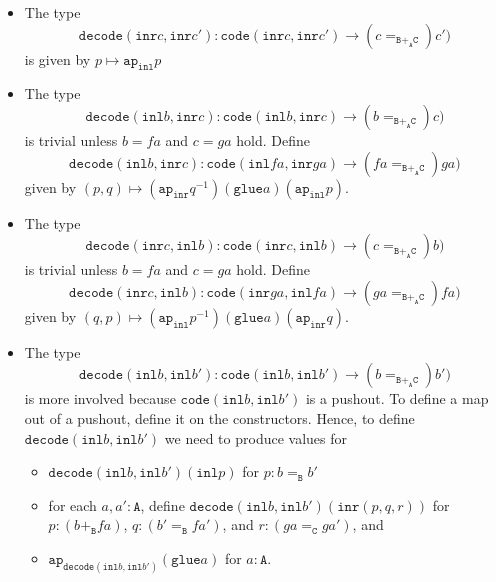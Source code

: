 \documentclass[12pt]{amsart}
\newcommand{\from}{\colon}
\newcommand{\type}[1]{\mathtt{#1}}
\newcommand{\A}{\type{A}}
\newcommand{\B}{\type{B}}
\newcommand{\C}{\type{C}}
\newcommand{\ap}{\type{ap}}
\newcommand{\inl}{\type{inl}}
\newcommand{\inr}{\type{inr}}
\newcommand{\glue}{\type{glue}}
\newcommand{\code}{\type{code}}
\newcommand{\decode}{\type{decode}}
\theoremstyle{remark}
\theoremstyle{definition}
\begin{document}
\begin{itemize}
	\item The type
	\[
		\decode ( \inr c , \inr c') \from 
		\code ( \inr c , \inr c' ) \to ( c =_{\B +_{\A} \C}) c' )
	\]
	is given by $ p \mapsto \ap_{\inl} p $
	\item The type 
	\[
		\decode ( \inl b , \inr c ) \from 
		\code ( \inl b , \inr c ) \to ( b =_{\B +_{\A} \C}) c )
	\]
	is trivial unless $ b = fa $ and $ c = ga $ hold. Define
	\[
		\decode ( \inl b , \inr c ) \from 
		\code ( \inl fa , \inr ga ) \to ( fa =_{\B +_{\A} \C}) ga )
	\]
	given by $ (p,q) \mapsto (\ap_{\inr} q^{-1}) (\glue a) (\ap_{\inl} p)$.
	\item The type 
	\[
		\decode ( \inr c , \inl b ) \from 
		\code ( \inr c , \inl b ) \to ( c =_{\B +_{\A} \C}) b )
	\]
	is trivial unless $ b = fa $ and $ c = ga $ hold. Define
	\[
		\decode ( \inr c , \inl b ) \from 
		\code ( \inr ga , \inl fa ) \to ( ga =_{\B +_{\A} \C}) fa )
	\]
	given by $ (q,p) \mapsto (\ap_{\inl} p^{-1}) (\glue a) (\ap_{\inr} q) $.
	\item The type 
	\[
		\decode ( \inl b , \inl b' ) \from 
		\code ( \inl b , \inl b' ) \to ( b =_{\B +_{\A} \C}) b' )
	\]
	is more involved because $ \code ( \inl b , \inl b' ) $ is a pushout.  To define a map out of a pushout, define it on the constructors.  Hence, to define $ \decode ( \inl b , \inl b' ) $ we need to produce values for
	\begin{itemize}
		\item $ \decode ( \inl b , \inl b' ) (\inl p) $ for $ p : b =_{\B} b' $
		\item for each $ a,a' : \A $, define $ \decode ( \inl b , \inl b' ) (\inr (p,q,r)) $ for $ p : (b +_{\B} fa) $, $ q : (b' =_{\B} fa') $, and $ r : (ga =_{\C} ga') $, and
		\item $ \ap_{\decode ( \inl b , \inl b' )} (\glue a)  $ for $ a : \A $.
	\end{itemize}
\end{itemize}
\end{document}
